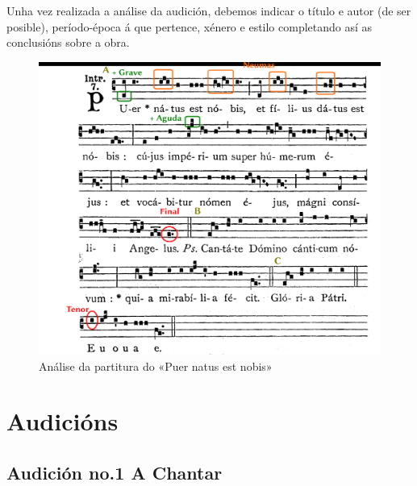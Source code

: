 \documentclass[a4paper, twoside]{templates/ociamthesis}
\begin{document}
Unha vez realizada a análise da audición, debemos indicar o título e autor (de ser posible), período-época á que pertence, xénero e estilo completando así as conclusións sobre a obra.

\begin{figure}[ht]

{\centering \includegraphics[width=1\linewidth]{figures/audicions/Puer-natus-comentado} 

}

\caption[Análise «Puer natus est nobis»]{Análise da partitura do «Puer natus est nobis» }\label{fig:Puer-natus-comentado}
\end{figure}

\newpage

\hypertarget{audiciuxf3ns}{%
\chapter*{Audicións}\label{audiciuxf3ns}}

\minitoc 

\hypertarget{audiciuxf3n-no.1-a-chantar}{%
\section*{Audición no.1 A Chantar}\label{audiciuxf3n-no.1-a-chantar}}
\end{document}
